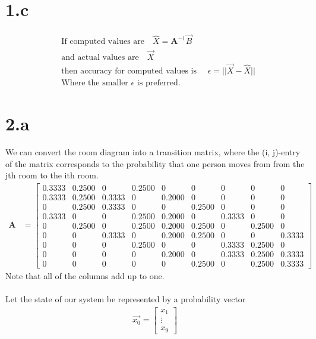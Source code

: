 \documentclass[letterpaper,12pt,titlepage,oneside,final]{book}
\newcommand{\matr}[1]{\mathbf{#1}} %
\begin{document}
\section*{1.c}
\begin{align*}
&\text{If computed values are}\quad
\hat{X} = \matr{A}^{-1}\vec{B}\\
&\text{and actual values are}\quad
\vec{X}\\
&\text{then accuracy for computed values is }\quad \epsilon =||\vec{X} - \hat{X}||\\
&\text{Where the smaller }\epsilon \text{ is preferred}. 
\end{align*}


\section*{2.a}
We can convert the room diagram into a transition matrix, where
the (i, j)-entry of the matrix corresponds to the probability that one person moves from from the jth room to the ith room.\\
\begin{align*}
\matr{A} &= \begin{bmatrix}
0.3333 &   0.2500  &     0 &   0.2500 &        0   &      0 &        0    &     0  &       0 \\
0.3333  &   0.2500  &  0.3333     &    0  &   0.2000 &     0   &      0  &       0   &      0\\
0 &   0.2500 &   0.3333  &       0   &      0  &  0.2500  &       0   &      0  &    0\\
0.3333 &  0 & 0 & 0.2500 &  0.2000   &  0  &  0.3333   & 0   & 0\\
0 &   0.2500   &   0 & 0.2500 &   0.2000 &   0.2500  &   0  &   0.2500  &   0 \\
0  & 0 &   0.3333 &  0 &   0.2000  &  0.2500 &  0   &  0 &  0.3333\\
0 &  0  & 0 &   0.2500  &  0 &   0 &   0.3333  &   0.2500 &    0 \\
0 &  0 & 0  &  0 &  0.2000 & 0 &   0.3333 &   0.2500 &   0.3333\\
0 &  0  &  0  &  0 &        0  &  0.2500  &       0  &  0.2500 &   0.3333
 \end{bmatrix}
\end{align*}
Note that all of the columns add up to one. 
\\
\\
Let the state of our system be represented by a probability vector
\begin{align*}
\vec{x_{0}} =  \begin{bmatrix}
	x_{1} \\
	\vdots\\
	x_{9} \end{bmatrix}
\end{align*}
\end{document}
